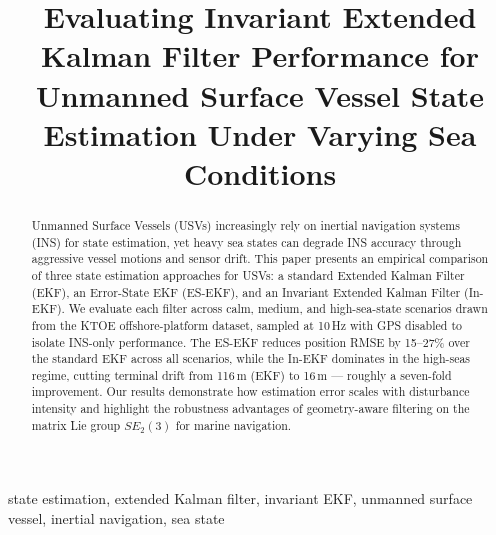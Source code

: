 \documentclass[conference]{IEEEtran}
\begin{document}
\title{Evaluating Invariant Extended Kalman Filter Performance for Unmanned Surface Vessel State Estimation Under Varying Sea Conditions}

\author{
  \and
  \and
}

\maketitle

\begin{abstract}
Unmanned Surface Vessels (USVs) increasingly rely on inertial navigation systems (INS) for state estimation, yet heavy sea states can degrade INS accuracy through aggressive vessel motions and sensor drift. This paper presents an empirical comparison of three state estimation approaches for USVs: a standard Extended Kalman Filter (EKF), an Error-State EKF (ES-EKF), and an Invariant Extended Kalman Filter (In-EKF). We evaluate each filter across calm, medium, and high-sea-state scenarios drawn from the KTOE offshore-platform dataset, sampled at 10\,Hz with GPS disabled to isolate INS-only performance. The ES-EKF reduces position RMSE by 15--27\% over the standard EKF across all scenarios, while the In-EKF dominates in the high-seas regime, cutting terminal drift from 116\,m (EKF) to 16\,m --- roughly a seven-fold improvement. Our results demonstrate how estimation error scales with disturbance intensity and highlight the robustness advantages of geometry-aware filtering on the matrix Lie group $SE_2(3)$ for marine navigation.
\end{abstract}

\begin{IEEEkeywords}
state estimation, extended Kalman filter, invariant EKF, unmanned surface vessel, inertial navigation, sea state
\end{IEEEkeywords}

\end{document}
